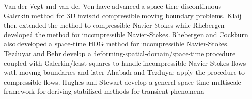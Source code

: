 \documentclass{article}
\theoremstyle{definition}
\theoremstyle{remark}
\begin{document}

Van der Vegt and van der Ven\cite{vanderVegtEuler} have advanced a space-time discontinuous Galerkin method 
for 3D inviscid compressible moving boundary problems.
Klaij \etal\cite{KlaijCompressible} then extended the method to compressible Navier-Stokes while Rhebergen \etal\cite{Rhebergen2013}
developed the method for incompressible Navier-Stokes.
Rhebergen and Cockburn\cite{RhebergenHDG} also developed a space-time HDG method for incompressible Navier-Stokes.
Tezduyar and Behr\cite{Tezduyar1992} develop a deforming-spatial-domain/space-time procedure coupled with Galerkin/least-squares 
to handle incompressible Navier-Stokes flows
with moving boundaries and later Aliabadi and Tezduyar\cite{Aliabadi1993} apply the procedure to compressible flows.
Hughes and Stewart\cite{HughesSpaceTime} develop a general space-time multiscale framework for deriving stabilized methods for
transient phenomena.

\end{document}
